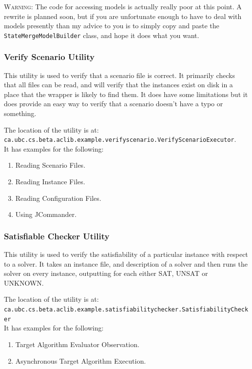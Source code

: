\documentclass[11pt,letterpaper,oneside]{article}
\begin{document}
{\Large \textsc{Warning:}} The code for accessing models is actually really poor at this point. A rewrite is planned soon, but if you are unfortunate enough to have to deal with models presently than my advice to you is to simply copy and paste the \texttt{StateMergeModelBuilder} class, and hope it does what you want.

\subsubsection{Verify Scenario Utility}

This utility is used to verify that a scenario file is correct. It primarily checks that all files can be read, and will verify that the instances exist on disk in a place that the wrapper is likely to find them. It does have some limitations but it does provide an easy way to verify that a scenario doesn't have a typo or something.

The location of the utility is at:\\ \texttt{ca.ubc.cs.beta.aclib.example.verifyscenario.VerifyScenarioExecutor}.
\\
It has examples for the following:

\begin{enumerate}
\item Reading Scenario Files.
\item Reading Instance Files.
\item Reading Configuration Files.
\item Using JCommander.
\end{enumerate}

\subsubsection{Satisfiable Checker Utility}

This utility is used to verify the satisfiability of a particular instance with respect to a solver. It takes an instance file, and description of a solver and then runs the solver on every instance, outputting for each either SAT, UNSAT or UNKNOWN.

The location of the utility is at:\\ \texttt{ca.ubc.cs.beta.aclib.example.satisfiabilitychecker.SatisfiabilityChecker}
\\
It has examples for the following:

\begin{enumerate}
\item Target Algorithm Evaluator Observation.
\item Asynchronous Target Algorithm Execution.
\end{enumerate}
\end{document}

